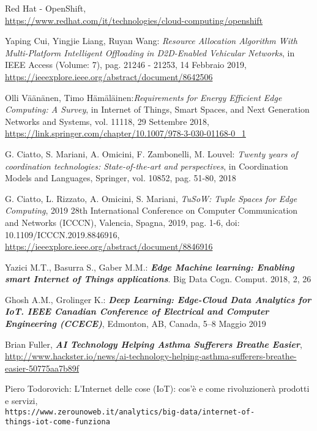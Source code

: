 \documentclass[a4paper,12pt,oneside]{book}
\begin{document}
\begin{thebibliography}{9}
	Red Hat - OpenShift,
	\\\url{https://www.redhat.com/it/technologies/cloud-computing/openshift}
	
	Yaping Cui, Yingjie Liang, Ruyan Wang: \textit{Resource Allocation Algorithm With Multi-Platform Intelligent Offloading in D2D-Enabled Vehicular Networks}, in IEEE Access (Volume: 7), pag. 21246 - 21253, 14 Febbraio 2019,
	\\\url{https://ieeexplore.ieee.org/abstract/document/8642506}
	
	Olli Väänänen, Timo Hämäläinen:\textit{Requirements for Energy Efficient Edge Computing: A Survey}, in Internet of Things, Smart Spaces, and Next Generation Networks and Systems, vol. 11118,  29 Settembre 2018,
	\\\url{https://link.springer.com/chapter/10.1007/978-3-030-01168-0_1}
	
	G. Ciatto, S. Mariani, A. Omicini, F. Zambonelli, M. Louvel: \textit{Twenty years of coordination technologies: State-of-the-art and perspectives}, in Coordination Models and Languages, Springer, vol. 10852, pag. 51-80, 2018
	
	G. Ciatto, L. Rizzato, A. Omicini, S. Mariani, \textit{TuSoW: Tuple Spaces for Edge Computing}, 2019 28th International Conference on Computer Communication and Networks (ICCCN), Valencia, Spagna, 2019, pag. 1-6, doi: 10.1109/ICCCN.2019.8846916,
	\\\url{https://ieeexplore.ieee.org/abstract/document/8846916}
	
	Yazici M.T., Basurra S., Gaber M.M.:  \textbf{\textit{Edge Machine learning: Enabling smart Internet of Things applications}}. Big Data Cogn. Comput. 2018, 2, 26
	
	Ghosh A.M., Grolinger K.: \textbf{\textit{Deep Learning: Edge-Cloud Data Analytics for IoT. IEEE Canadian Conference of Electrical and Computer Engineering (CCECE)}}, Edmonton, AB, Canada, 5–8 Maggio 2019
	
	Brian Fuller, \textbf{\textit{AI Technology Helping Asthma Sufferers Breathe Easier}},
	\\\url{http://www.hackster.io/news/ai-technology-helping-asthma-sufferers-breathe-easier-50775aa7b89f}
	
	
	
	
	
	
	
	Piero Todorovich: L’Internet delle cose (IoT): cos’è e come rivoluzionerà prodotti e servizi,
	\\\texttt{https://www.zerounoweb.it/analytics/big-data/internet-of-\\things-iot-come-funziona}
	

\end{thebibliography}
\end{document}
